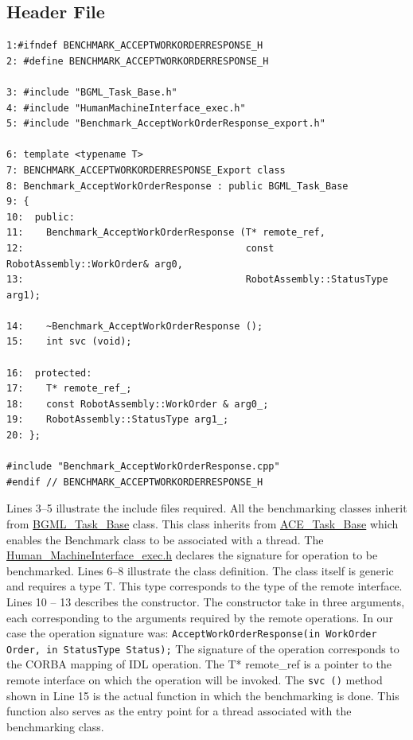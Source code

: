 \documentclass[onecolumn]{article}
\begin{document}
\subsection* {Header File}
{
\footnotesize
\begin{verbatim}
1:#ifndef BENCHMARK_ACCEPTWORKORDERRESPONSE_H
2: #define BENCHMARK_ACCEPTWORKORDERRESPONSE_H

3: #include "BGML_Task_Base.h"
4: #include "HumanMachineInterface_exec.h"
5: #include "Benchmark_AcceptWorkOrderResponse_export.h"

6: template <typename T>
7: BENCHMARK_ACCEPTWORKORDERRESPONSE_Export class
8: Benchmark_AcceptWorkOrderResponse : public BGML_Task_Base
9: {
10:  public:
11:    Benchmark_AcceptWorkOrderResponse (T* remote_ref,
12:                                       const RobotAssembly::WorkOrder& arg0,
13:                                       RobotAssembly::StatusType arg1);

14:    ~Benchmark_AcceptWorkOrderResponse ();
15:    int svc (void);

16:  protected:
17:    T* remote_ref_;
18:    const RobotAssembly::WorkOrder & arg0_;
19:    RobotAssembly::StatusType arg1_;
20: };

#include "Benchmark_AcceptWorkOrderResponse.cpp"
#endif // BENCHMARK_ACCEPTWORKORDERRESPONSE_H
\end{verbatim}
}
\normalsize

Lines 3--5 illustrate the include files required. All the benchmarking
classes inherit from \url{BGML_Task_Base} class. This class inherits
from \url{ACE_Task_Base} which enables the Benchmark class to be
associated with a thread. The \url{Human_MachineInterface_exec.h}
declares the signature for operation to be benchmarked. Lines 6--8
illustrate the class definition. The class itself is generic and requires
a type T. This type corresponds to the type of the remote interface.
Lines 10 -- 13 describes the constructor. The constructor take in three
arguments, each corresponding to the arguments required by the remote
operations. In our case the operation signature was:
{\tt AcceptWorkOrderResponse(in WorkOrder Order, in StatusType Status);}
The signature of the operation corresponds to the CORBA mapping of IDL
operation. The T* remote\_ref is a pointer to the remote interface on which
the operation will be invoked. The {\tt svc ()} method shown in Line 15
is the actual function in which the benchmarking is done. This function
also serves as the entry point for a thread associated with the benchmarking
class.
\end{document}
